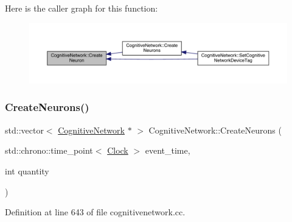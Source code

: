 Here is the caller graph for this function\+:
\nopagebreak
\begin{figure}[H]
\begin{center}
\leavevmode
\includegraphics[width=350pt]{class_cognitive_network_a9b5fcaf824d5b587775e7c44630affe6_icgraph}
\end{center}
\end{figure}
\mbox{\label{class_cognitive_network_af9b2a136584c962e44114a7ee3d2804a}} 
\subsubsection{\texorpdfstring{Create\+Neurons()}{CreateNeurons()}}
{\footnotesize\ttfamily std\+::vector$<$ \hyperlink{class_cognitive_network}{Cognitive\+Network} $\ast$ $>$ Cognitive\+Network\+::\+Create\+Neurons (\begin{DoxyParamCaption}\item[{std\+::chrono\+::time\+\_\+point$<$ \hyperlink{universe_8h_a0ef8d951d1ca5ab3cfaf7ab4c7a6fd80}{Clock} $>$}]{event\+\_\+time,  }\item[{int}]{quantity }\end{DoxyParamCaption})}



Definition at line 643 of file cognitivenetwork.\+cc.

